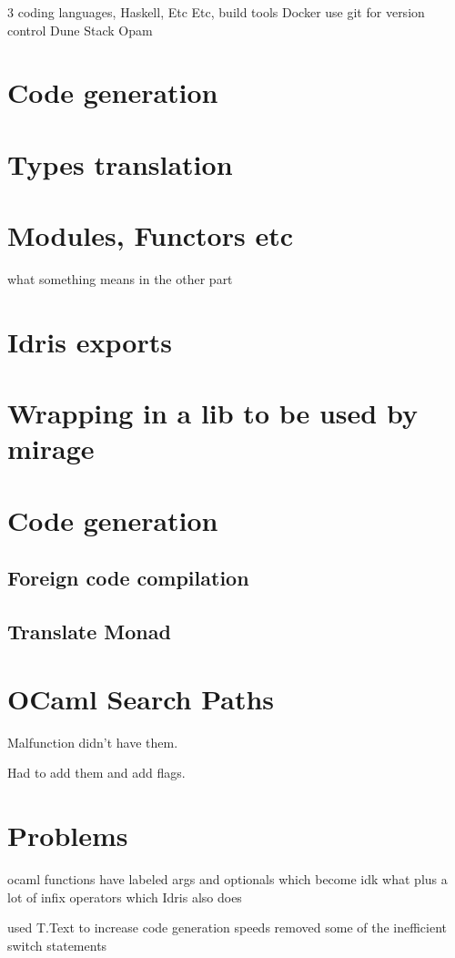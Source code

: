 
3 coding languages, Haskell, Etc Etc, build tools Docker
use git for version control Dune Stack Opam 

\section{Code generation}




\section{Types translation}

\section{Modules, Functors etc}

what something means in the other part

\section{Idris exports}

\section{Wrapping in a lib to be used by mirage}

\section{Code generation}
\subsection{Foreign code compilation}
\subsection{Translate Monad}

\section{OCaml Search Paths}
Malfunction didn't have them. 

Had to add them and add flags.

\section{Problems}

ocaml functions have labeled args and optionals which become idk
what plus a lot of infix operators which Idris also does

used T.Text to increase code generation speeds 
removed some of the inefficient switch statements